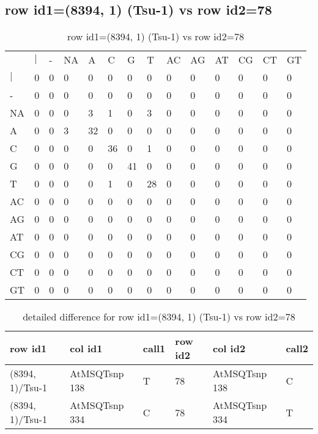 \subsection{row id1=(8394, 1) (Tsu-1) vs row id2=78}
\begin{center}
\begin{longtable}{|l|l|l|l|l|l|l|l|l|l|l|l|l|l|}
\caption{row id1=(8394, 1) (Tsu-1) vs row id2=78} \label{table_dm644}\\
\hline
\\
\hline
&$|$&-&NA&A&C&G&T&AC&AG&AT&CG&CT&GT\\
$|$&0&0&0&0&0&0&0&0&0&0&0&0&0\\
-&0&0&0&0&0&0&0&0&0&0&0&0&0\\
NA&0&0&0&3&1&0&3&0&0&0&0&0&0\\
A&0&0&3&32&0&0&0&0&0&0&0&0&0\\
C&0&0&0&0&36&0&1&0&0&0&0&0&0\\
G&0&0&0&0&0&41&0&0&0&0&0&0&0\\
T&0&0&0&0&1&0&28&0&0&0&0&0&0\\
AC&0&0&0&0&0&0&0&0&0&0&0&0&0\\
AG&0&0&0&0&0&0&0&0&0&0&0&0&0\\
AT&0&0&0&0&0&0&0&0&0&0&0&0&0\\
CG&0&0&0&0&0&0&0&0&0&0&0&0&0\\
CT&0&0&0&0&0&0&0&0&0&0&0&0&0\\
GT&0&0&0&0&0&0&0&0&0&0&0&0&0\\
\hline
\end{longtable}
\end{center}

\begin{center}
\begin{longtable}{|l|l|l|l|l|l|}
\caption{detailed difference for row id1=(8394, 1) (Tsu-1) vs row id2=78} \label{table_dm645}\\
\hline
row id1&col id1&call1&row id2&col id2&call2\\
\hline
(8394, 1)/Tsu-1&AtMSQTsnp 138&T&78&AtMSQTsnp 138&C\\
(8394, 1)/Tsu-1&AtMSQTsnp 334&C&78&AtMSQTsnp 334&T\\
\hline
\end{longtable}
\end{center}

